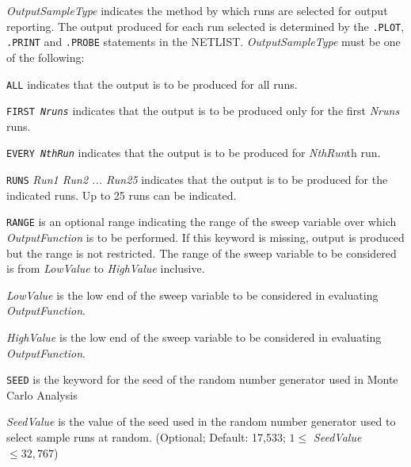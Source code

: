 \begin{widelist}

\item[{\it OutputSampleType}] indicates the method by which runs are selected
                  for output reporting.
          The output produced for each run selected is determined by the
          {\tt .PLOT}, {\tt .PRINT} and {\tt .PROBE} statements in
          the NETLIST.
          {\it OutputSampleType} must be one of the following:
          \begin{widelist}
          \item[{\tt ALL}]
          indicates that  the output is to be produced for all runs.

          \item[{\tt FIRST {\it Nruns}}]
          indicates that  the output is to be produced only for the
          first {\it Nruns} runs.

          \item[{\tt EVERY {\it NthRun}}]
          indicates that  the output is to be produced for
          {\it NthRun}th run.

          \item[{\tt RUNS} {\it Run1 \B Run2 ... \B Run25 \E\E}]
          indicates that  the output is to be produced for the
          indicated runs. Up to 25 runs can be indicated.

          \end{widelist}
{
\item[{\tt RANGE}] is an optional range indicating the range of the sweep
                  variable over which {\it OutputFunction} is to be performed.
          If this keyword is missing, output is produced but
          the range is not restricted.  The range of the sweep
          variable to be considered is from {\it LowValue}
          to {\it HighValue} inclusive.

\item[{\it LowValue}] is the low end of the sweep variable to be considered
                  in evaluating {\it OutputFunction}.


\item[{\it HighValue}] is the low end of the sweep variable to be considered
                  in evaluating {\it OutputFunction}.


\item[{\tt SEED}] is the keyword for the seed of the random number generator
                  used in Monte Carlo Analysis

\item[{\it SeedValue}] is the value of the seed used in the random number
generator used to select sample runs at random.
    (Optional; Default: 17,533; $1 \le$ {\it SeedValue}$ \le 32,767$)
}

\end{widelist}


